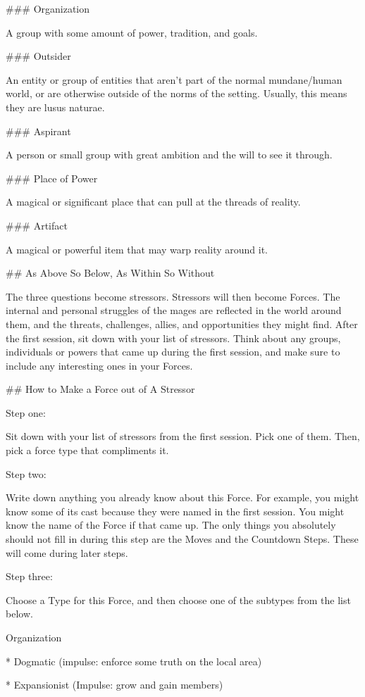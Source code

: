 \documentclass[
  oneside,
  statementpaper,
  9pt]{memoir}
\begin{document}
\begin{MC}
### Organization

A group with some amount of power, tradition, and goals. 

### Outsider

An entity or group of entities that aren’t part of the normal mundane/human world, or are otherwise outside of the norms of the setting. Usually, this means they are lusus naturae.

### Aspirant

A person or small group with great ambition and the will to see it through.

### Place of Power

A magical or significant place that can pull at the threads of reality.

### Artifact

A magical or powerful item that may warp reality around it.

## As Above So Below, As Within So Without

The three questions become stressors. Stressors will then become Forces. The internal and personal struggles of the mages are reflected in the world around them, and the threats, challenges, allies, and opportunities they might find. After the first session, sit down with your list of stressors. Think about any groups, individuals or powers that came up during the first session, and make sure to include any interesting ones in your Forces.

## How to Make a Force out of A Stressor

Step one:

Sit down with your list of stressors from the first session. Pick one of them. Then, pick a force type that compliments it.

Step two:

Write down anything you already know about this Force. For example, you might know some of its cast because they were named in the first session. You might know the name of the Force if that came up. The only things you absolutely should not fill in during this step are the Moves and the Countdown Steps. These will come during later steps.

Step three:

Choose a Type for this Force, and then choose one of the subtypes from the list below.

Organization

* Dogmatic (impulse: enforce some truth on the local area)

* Expansionist (Impulse: grow and gain members)


\end{MC}
\end{document}
